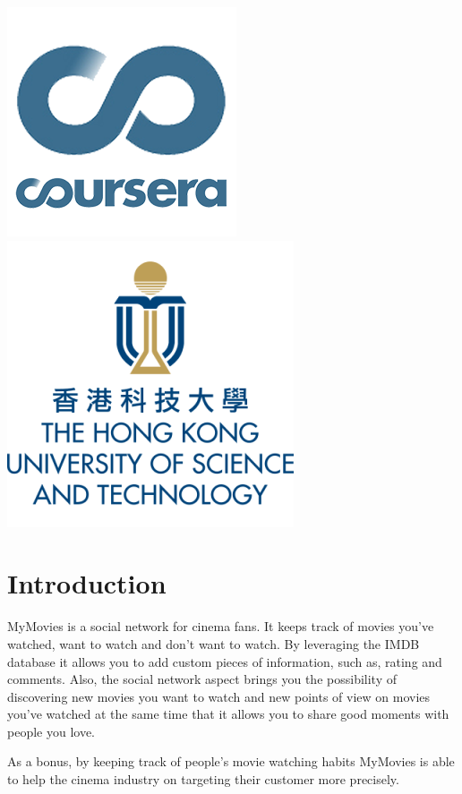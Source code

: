 \begin{titlepage}
\vfill
\includegraphics[width=.2\paperwidth]{coursera.png}
\hspace{2cm}
\includegraphics[width=.2\paperwidth]{hkust.png}

\end{titlepage}

\section{Introduction}

MyMovies is a social network for cinema fans. It keeps track of movies you've
watched, want to watch and don't want to watch. By leveraging the IMDB database
it allows you to add custom pieces of information, such as, rating and
comments. Also, the social network aspect brings you the possibility of
discovering new movies you want to watch and new points of view on movies
you've watched at the same time that it allows you to share good moments with
people you love.

As a bonus, by keeping track of people's movie watching habits MyMovies is able
to help the cinema industry on targeting their customer more precisely.


